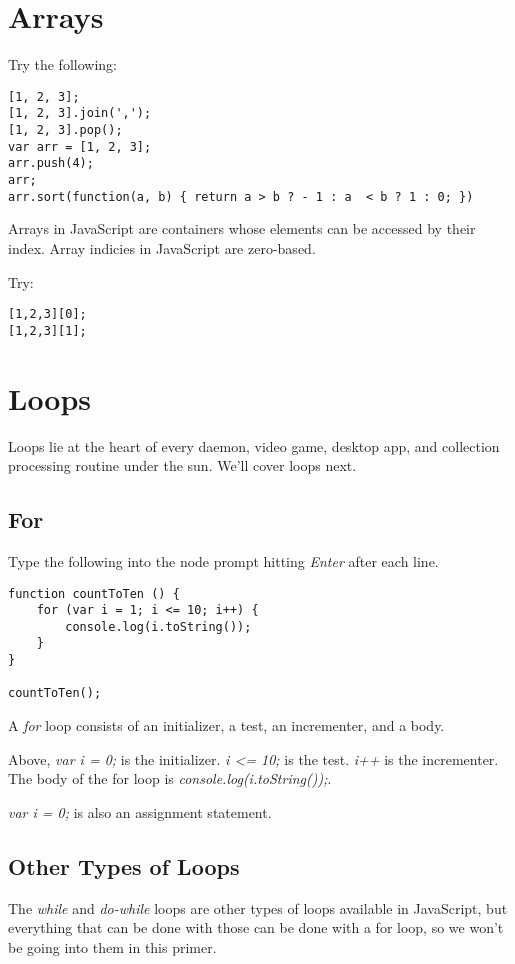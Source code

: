 \documentclass{article}
\begin{document}

\section{Arrays}
Try the following:
\begin{lstlisting}
[1, 2, 3];
[1, 2, 3].join(',');
[1, 2, 3].pop();
var arr = [1, 2, 3];
arr.push(4);
arr;
arr.sort(function(a, b) { return a > b ? - 1 : a  < b ? 1 : 0; }) 
\end{lstlisting}

Arrays in JavaScript are containers whose elements can be accessed by their index. Array indicies in JavaScript are zero-based.

Try:
\begin{lstlisting}
[1,2,3][0];
[1,2,3][1];
\end{lstlisting}

\section{Loops}
Loops lie at the heart of every daemon, video game, desktop app, and collection processing routine under the sun. We'll cover loops next.
\subsection{For}
Type the following into the node prompt hitting \emph{Enter} after each line.

\begin{lstlisting}
function countToTen () {
    for (var i = 1; i <= 10; i++) {
        console.log(i.toString());
    }
}

countToTen();
\end{lstlisting}

A \emph{for} loop consists of an initializer, a test, an incrementer, and a body.

Above, \emph{var i = 0;} is the initializer. \emph{i <= 10;} is the test. \emph{i++} is the incrementer. The body of the for loop is \emph{console.log(i.toString());}.

\emph{var i = 0;} is also an assignment statement. 

\subsection {Other Types of Loops}
The \emph{while} and \emph{do-while} loops are other types of loops available in JavaScript, but everything that can be done with those can be done with a for loop, so we won't be going into them in this primer.
\end{document}
